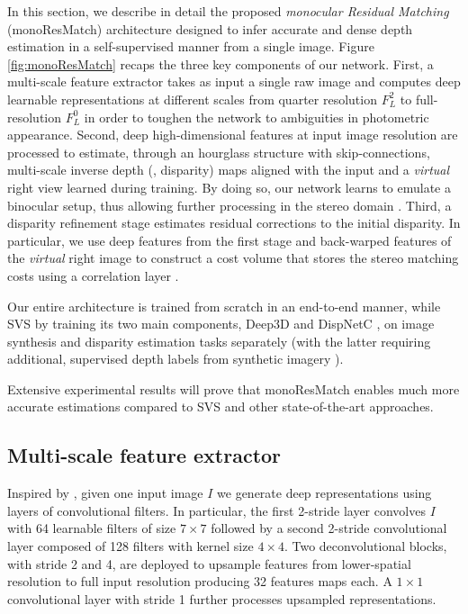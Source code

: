 \documentclass[10pt,twocolumn,letterpaper]{article}
\begin{document}
In this section, we describe in detail the proposed \emph{monocular Residual Matching} (monoResMatch) architecture designed to infer accurate and dense depth estimation in a self-supervised manner from a single image. Figure \ref{fig:monoResMatch} recaps the three key components of our network. First, a multi-scale feature extractor takes as input a single raw image and computes deep learnable representations at different scales from quarter resolution $F_L^2$ to full-resolution $F_L^0$ in order to toughen the network to ambiguities in photometric appearance. Second, deep high-dimensional features at input image resolution are processed to estimate, through an hourglass structure with skip-connections, multi-scale inverse depth (\ie, disparity) maps aligned with the input and a \emph{virtual} right view learned during training. By doing so, our network learns to emulate a binocular setup, thus allowing further processing in the stereo domain \cite{luo2018single}.  
Third, a disparity refinement stage estimates residual corrections to the initial disparity. In particular, we use deep features from the first stage and back-warped features of the \emph{virtual} right image to construct a cost volume that stores the stereo matching costs using a correlation layer \cite{Mayer_2016_CVPR}.

Our entire architecture is trained from scratch in an end-to-end manner, while SVS \cite{luo2018single} by training its two main components, Deep3D \cite{xie2016deep3d} and DispNetC \cite{Mayer_2016_CVPR}, on image synthesis and disparity estimation tasks separately (with the latter requiring additional, supervised depth labels from synthetic imagery \cite{Mayer_2016_CVPR}).

Extensive experimental results will prove that monoResMatch enables much more accurate estimations compared to SVS and other state-of-the-art approaches.



\subsection{Multi-scale feature extractor}

Inspired by \cite{Liang_2018_CVPR}, given one input image $I$ we generate deep representations using layers of convolutional filters. In particular, the first 2-stride layer convolves $I$ with 64 learnable filters of size $7\times7$ followed by a second 2-stride convolutional layer composed of 128 filters with kernel size $4\times4$. Two deconvolutional blocks, with stride 2 and 4, are deployed to upsample features from lower-spatial resolution to full input resolution producing 32 features maps each. A $1\times1$ convolutional layer with stride 1 further processes upsampled representations.
\end{document}
